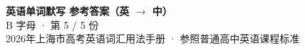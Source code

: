 \documentclass[10pt,a4paper]{article}
\begin{document}
\pagestyle{plain}

\begin{center}
{\LARGE\bfseries 英语单词默写 \quad 参考答案（英 $\to$ 中）}\\[0.22em]
{\large B 字母 · 第 5 / 5 份}\\[0.18em]
{\small 2026年上海市高考英语词汇用法手册 · 参照普通高中英语课程标准}
\end{center}

\vspace{0.2em}
\noindent{\color{rulegray}\rule{\textwidth}{0.8pt}}

\vspace{0.35em}

\vspace{0.25em}
\renewcommand{\arraystretch}{1.32}
\end{document}
